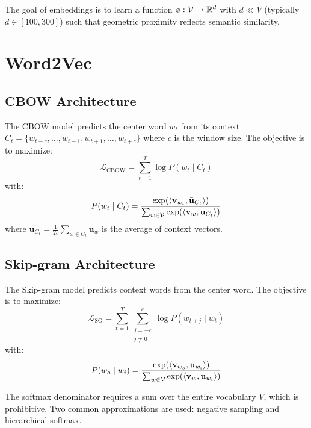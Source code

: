 The goal of embeddings is to learn a function
$\phi : \mathcal{V} \to \mathbb{R}^d$ with $d \ll V$ (typically $d \in [100, 300]$)
such that geometric proximity reflects semantic similarity.

\section{Word2Vec}
\label{sec:emb:word2vec}

\subsection{CBOW Architecture}

\begin{definition}
The CBOW model predicts the center word $w_t$ from its context
$C_t = \{w_{t-c}, \ldots, w_{t-1}, w_{t+1}, \ldots, w_{t+c}\}$ where $c$ is
the window size. The objective is to maximize:
\[
\mathcal{L}_{\text{CBOW}} = \sum_{t=1}^{T} \log P(w_t \mid C_t)
\]
with:
\[
P(w_t \mid C_t) = \frac{\exp(\langle \mathbf{v}_{w_t}, \bar{\mathbf{u}}_{C_t} \rangle)}{\sum_{w \in \mathcal{V}} \exp(\langle \mathbf{v}_w, \bar{\mathbf{u}}_{C_t} \rangle)}
\]
where $\bar{\mathbf{u}}_{C_t} = \frac{1}{2c} \sum_{w \in C_t} \mathbf{u}_w$
is the average of context vectors.
\end{definition}

\subsection{Skip-gram Architecture}

\begin{definition}
The Skip-gram model predicts context words from the center word. The objective
is to maximize:
\[
\mathcal{L}_{\text{SG}} = \sum_{t=1}^{T} \sum_{\substack{j=-c \\ j \neq 0}}^{c} \log P(w_{t+j} \mid w_t)
\]
with:
\[
P(w_o \mid w_i) = \frac{\exp(\langle \mathbf{v}_{w_o}, \mathbf{u}_{w_i} \rangle)}{\sum_{w \in \mathcal{V}} \exp(\langle \mathbf{v}_w, \mathbf{u}_{w_i} \rangle)}
\]
\end{definition}

\begin{warning}[title=\textbf{Softmax cost}]
The softmax denominator requires a sum over the entire vocabulary $V$, which
is prohibitive. Two common approximations are used: negative sampling and
hierarchical softmax.
\end{warning}

